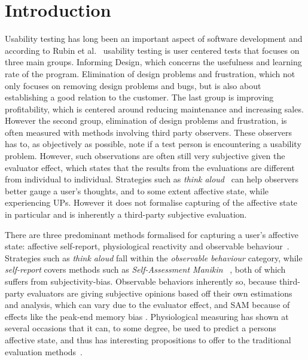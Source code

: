 \section{Introduction}

Usability testing has long been an important aspect of software development and according to Rubin et al.~\cite{rubin2008handbook} usability testing is user centered tests that focuses on three main groups.
Informing Design, which concerns the usefulness and learning rate of the program.
Elimination of design problems and frustration, which not only focuses on removing design problems and bugs, but is also about establishing a good relation to the customer.
The last group is improving profitability, which is centered around reducing maintenance and increasing sales.
However the second group, elimination of design problems and frustration, is often measured with methods involving third party observers.
These observers has to, as objectively as possible, note if a test person is encountering a usability problem.
However, such observations are often still very subjective given the evaluator effect\cite{eval_effect}, which states that the results from the evaluations are different from individual to individual.
Strategies such as \textit{think aloud}~\cite{use_of_TA_and_IDA} can help observers better gauge a user's
thoughts, and to some extent affective state, while experiencing UPs. However it does
not formalise capturing of the affective state in particular and is inherently a third-party
subjective evaluation. 

There are three predominant methods formalised for capturing a user's affective state: affective self-report, physiological reactivity and
observable behaviour~\cite{BRADLEY199449}. Strategies such as \textit{think
aloud} fall within the \textit{observable behaviour} category, while
\textit{self-report} covers methods such as \textit{Self-Assessment Manikin}
~\cite{BRADLEY199449}, both of which suffers from subjectivity-bias. 
Observable behaviors inherently so, because third-party evaluators are giving subjective opinions based off their own estimations and analysis, which can vary due to the evaluator effect, and SAM because of effects like the peak-end memory bias \cite{cockburn_peakend}.
Physiological measuring has shown at several occasions that it can, to some degree, be used to predict a persons
affective state, and thus has interesting propositions to offer to the traditional evaluation methods~\cite{eeg_facial_expressions,fusion4,90_percent_eeg_emotion}.

